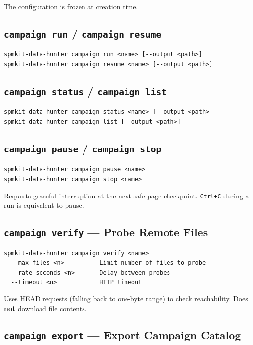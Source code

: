 \documentclass[11pt,a4paper]{article}
\begin{document}
The configuration is frozen at creation time.

\subsection{\texttt{campaign run} / \texttt{campaign resume}}

\begin{lstlisting}
spmkit-data-hunter campaign run <name> [--output <path>]
spmkit-data-hunter campaign resume <name> [--output <path>]
\end{lstlisting}

\subsection{\texttt{campaign status} / \texttt{campaign list}}

\begin{lstlisting}
spmkit-data-hunter campaign status <name> [--output <path>]
spmkit-data-hunter campaign list [--output <path>]
\end{lstlisting}

\subsection{\texttt{campaign pause} / \texttt{campaign stop}}

\begin{lstlisting}
spmkit-data-hunter campaign pause <name>
spmkit-data-hunter campaign stop <name>
\end{lstlisting}

Requests graceful interruption at the next safe page checkpoint. \texttt{Ctrl+C} during a run is equivalent to pause.

\subsection{\texttt{campaign verify} --- Probe Remote Files}

\begin{lstlisting}
spmkit-data-hunter campaign verify <name>
  --max-files <n>          Limit number of files to probe
  --rate-seconds <n>       Delay between probes
  --timeout <n>            HTTP timeout
\end{lstlisting}

Uses HEAD requests (falling back to one-byte range) to check reachability. Does \textbf{not} download file contents.

\subsection{\texttt{campaign export} --- Export Campaign Catalog}
\end{document}
